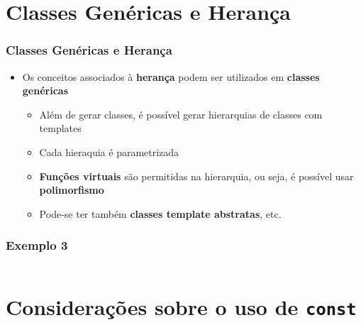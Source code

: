 \documentclass[aspectratio=169]{beamer}
\begin{document}
\section{Classes Genéricas e Herança}

\begin{frame}\frametitle{Classes Genéricas e Herança}
\begin{itemize}
	\item Os conceitos associados à \textbf{herança} podem ser utilizados em \textbf{classes genéricas}
	\begin{itemize}
		\item Além de gerar classes, é possível gerar hierarquias de classes com templates
		\item Cada hieraquia é parametrizada
		\item \textbf{Funções virtuais} são permitidas na hierarquia, ou seja, é possível usar \textbf{polimorfismo}
		\item Pode-se ter também \textbf{classes template abstratas}, etc.
	\end{itemize}
\end{itemize}
\end{frame}

\begin{frame}[fragile]\frametitle{Exemplo 3}
\begin{columns}
\begin{column}{0.6\linewidth}

\end{column}
\begin{column}{0.4\linewidth}

\end{column}
\end{columns}
\end{frame}

\section{Considerações sobre o uso de \texttt{const}}
\end{document}
